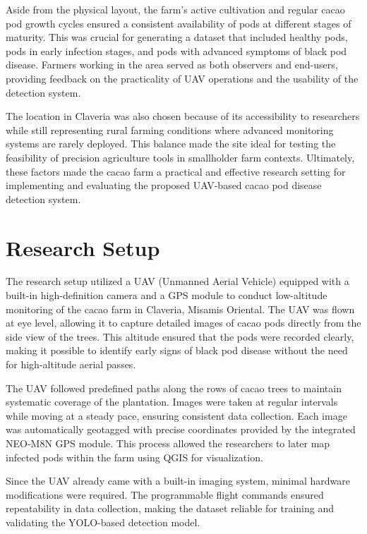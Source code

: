 Aside from the physical layout, the farm’s active cultivation and regular cacao pod growth cycles ensured a consistent availability of pods at different stages of maturity.
This was crucial for generating a dataset that included healthy pods, pods in early infection stages, and pods with advanced symptoms of black pod disease.
Farmers working in the area served as both observers and end-users, providing feedback on the practicality of UAV operations and the usability of the detection system.

The location in Claveria was also chosen because of its accessibility to researchers while still representing rural farming conditions where advanced monitoring systems are rarely deployed.
This balance made the site ideal for testing the feasibility of precision agriculture tools in smallholder farm contexts.
Ultimately, these factors made the cacao farm a practical and effective research setting for implementing and evaluating the proposed UAV-based cacao pod disease detection system.

\section{Research Setup}

The research setup utilized a UAV (Unmanned Aerial Vehicle) equipped with a built-in high-definition camera and a GPS module to conduct low-altitude monitoring of the cacao farm in Claveria, Misamis Oriental.
The UAV was flown at eye level, allowing it to capture detailed images of cacao pods directly from the side view of the trees.
This altitude ensured that the pods were recorded clearly, making it possible to identify early signs of black pod disease without the need for high-altitude aerial passes.

The UAV followed predefined paths along the rows of cacao trees to maintain systematic coverage of the plantation.
Images were taken at regular intervals while moving at a steady pace, ensuring consistent data collection.
Each image was automatically geotagged with precise coordinates provided by the integrated NEO-M8N GPS module.
This process allowed the researchers to later map infected pods within the farm using QGIS for visualization.

Since the UAV already came with a built-in imaging system, minimal hardware modifications were required.
The programmable flight commands ensured repeatability in data collection, making the dataset reliable for training and validating the YOLO-based detection model.

